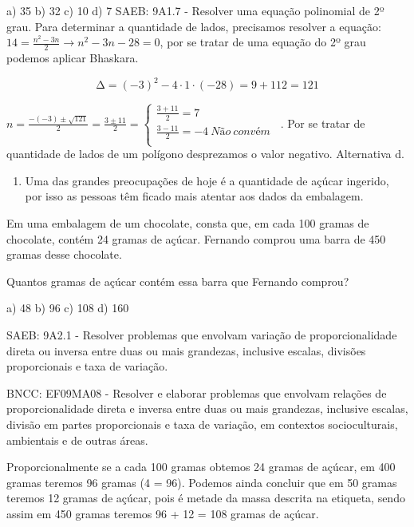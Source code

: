 \begin{escolha}
\begin{escolha}
\begin{escolha}
\begin{escolha}
{\begin{boxmedio}
\begin{boxpeq}
\begin{q°}
\begin{boxmedio}
\begin{boxpeq}
\begin{boxpeq}
\begin{boxmedio}
\begin{boxmedio}
\begin{boxmedio}
\begin{largebox}
\begin{boxmedio}
{\begin{escolha}
\begin{escolha}
\begin{escolha}
\begin{escolha}
\begin{escolha}
\begin{escolha}
{a) 35 b) 32 c) 10 d) 7 SAEB: 9A1.7 - Resolver uma equação polinomial de
2º grau. Para determinar a quantidade de lados, precisamos resolver a
equação: $14 = \frac{n^{2} - 3n}{2} \rightarrow n^{2} - 3n - 28 = 0$,
por se tratar de uma equação do 2º grau podemos aplicar Bhaskara.

\[\mathrm{\Delta} = \left( - 3 \right)^{2} - 4 \cdot 1 \cdot \left( - 28 \right) = 9 + 112 = 121\]

$n = \frac{- ( - 3) \pm \sqrt{121}}{2} = \frac{3 \pm 11}{2} = \left\{ \begin{matrix} \frac{3 + 11}{2} = 7\ \ \ \ \ \ \ \ \ \ \ \ \ \ \ \ \ \ \ \ \ \ \ \ \ \ \ \ \ \  \\ \frac{3 - 11}{2} = - 4\ Não\ convém \\ \end{matrix} \right.\ $.
Por se tratar de quantidade de lados de um polígono desprezamos o valor
negativo. Alternativa d.

\begin{enumerate}
\num{\arabic{enumi}.}
\setcounter{enumi}{7}
\tightlist
\item
  Uma das grandes preocupações de hoje é a quantidade de açúcar
  ingerido, por isso as pessoas têm ficado mais atentar aos dados da
  embalagem.
\end{enumerate}

Em uma embalagem de um chocolate, consta que, em cada 100 gramas de
chocolate, contém 24 gramas de açúcar. Fernando comprou uma barra de 450
gramas desse chocolate.

Quantos gramas de açúcar contém essa barra que Fernando comprou?

a) 48 b) 96 c) 108 d) 160

SAEB: 9A2.1 - Resolver problemas que envolvam variação de
proporcionalidade direta ou inversa entre duas ou mais grandezas,
inclusive escalas, divisões proporcionais e taxa de variação.

BNCC: EF09MA08 - Resolver e elaborar problemas que envolvam relações de
proporcionalidade direta e inversa entre duas ou mais grandezas,
inclusive escalas, divisão em partes proporcionais e taxa de variação,
em contextos socioculturais, ambientais e de outras áreas.

Proporcionalmente se a cada 100 gramas obtemos 24 gramas de açúcar, em
400 gramas teremos 96 gramas (4  = 96). Podemos ainda concluir que
em 50 gramas teremos 12 gramas de açúcar, pois é metade da massa
descrita na etiqueta, sendo assim em 450 gramas teremos 96 + 12 = 108
gramas de açúcar.

}
\end{escolha}
\end{escolha}
\end{escolha}
\end{escolha}
\end{escolha}
\end{escolha}}
\end{boxmedio}
\end{largebox}
\end{boxmedio}
\end{boxmedio}
\end{boxmedio}
\end{boxpeq}
\end{boxpeq}
\end{boxmedio}
\end{q°}
\end{boxpeq}
\end{boxmedio}}
\end{escolha}
\end{escolha}
\end{escolha}
\end{escolha}

